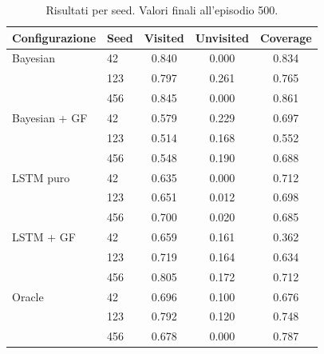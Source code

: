 \begin{table}[ht]
\centering
\small
\caption{Risultati per seed. Valori finali all'episodio 500.}
\label{tab:results_per_seed}
\begin{tabular}{llccc}
\toprule
\textbf{Configurazione} & \textbf{Seed} & \textbf{Visited} & \textbf{Unvisited} & \textbf{Coverage} \\
\midrule
Bayesian & 42 & 0.840 & 0.000 & 0.834 \\
 & 123 & 0.797 & 0.261 & 0.765 \\
 & 456 & 0.845 & 0.000 & 0.861 \\
\midrule
Bayesian + GF & 42 & 0.579 & 0.229 & 0.697 \\
 & 123 & 0.514 & 0.168 & 0.552 \\
 & 456 & 0.548 & 0.190 & 0.688 \\
\midrule
LSTM puro & 42 & 0.635 & 0.000 & 0.712 \\
 & 123 & 0.651 & 0.012 & 0.698 \\
 & 456 & 0.700 & 0.020 & 0.685 \\
\midrule
LSTM + GF & 42 & 0.659 & 0.161 & 0.362 \\
 & 123 & 0.719 & 0.164 & 0.634 \\
 & 456 & 0.805 & 0.172 & 0.712 \\
\midrule
Oracle & 42 & 0.696 & 0.100 & 0.676 \\
 & 123 & 0.792 & 0.120 & 0.748 \\
 & 456 & 0.678 & 0.000 & 0.787 \\
\bottomrule
\end{tabular}
\end{table}